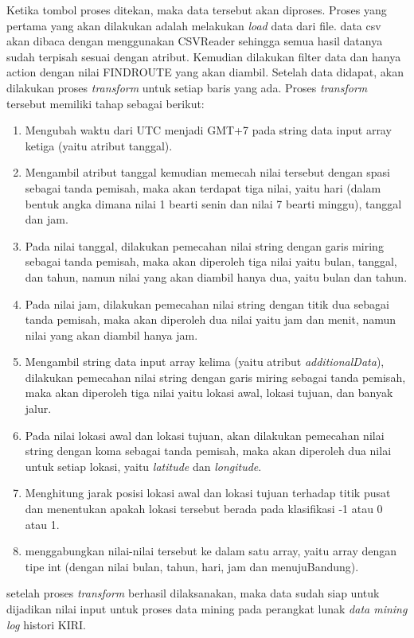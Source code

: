 Ketika tombol proses ditekan, maka data tersebut akan diproses. Proses yang pertama yang akan dilakukan adalah melakukan \textsl{load} data dari file. data csv akan dibaca dengan menggunakan CSVReader sehingga semua hasil datanya sudah terpisah sesuai dengan atribut. Kemudian dilakukan filter data dan hanya action dengan nilai FINDROUTE yang akan diambil. Setelah data didapat, akan dilakukan proses \textsl{transform} untuk setiap baris yang ada. Proses \textsl{transform} tersebut memiliki tahap sebagai berikut:
\begin{enumerate}
	\item Mengubah waktu dari UTC menjadi GMT+7 pada string data input array ketiga (yaitu atribut tanggal).
	\item Mengambil atribut tanggal kemudian memecah nilai tersebut dengan spasi sebagai tanda pemisah, maka akan terdapat tiga nilai, yaitu hari (dalam bentuk angka dimana nilai 1 bearti senin dan nilai 7 bearti minggu), tanggal dan jam.
	\item Pada nilai tanggal, dilakukan pemecahan nilai string dengan garis miring sebagai tanda pemisah, maka akan diperoleh tiga nilai yaitu bulan, tanggal, dan tahun, namun nilai yang akan diambil hanya dua, yaitu bulan dan tahun.
	\item Pada nilai jam, dilakukan pemecahan nilai string dengan titik dua sebagai tanda pemisah, maka akan diperoleh dua nilai yaitu jam dan menit, namun nilai yang akan diambil hanya jam.
	\item Mengambil string data input array kelima (yaitu atribut \textsl{additionalData}), dilakukan pemecahan nilai string dengan garis miring sebagai tanda pemisah, maka akan diperoleh tiga nilai yaitu lokasi awal, lokasi tujuan, dan banyak jalur.
	\item Pada nilai lokasi awal dan lokasi tujuan, akan dilakukan pemecahan nilai string dengan koma sebagai tanda pemisah, maka akan diperoleh dua nilai untuk setiap lokasi, yaitu \textsl{latitude} dan \textsl{longitude}.
	\item Menghitung jarak posisi lokasi awal dan lokasi tujuan terhadap titik pusat dan menentukan apakah lokasi tersebut berada pada klasifikasi -1 atau 0 atau 1.
	\item menggabungkan nilai-nilai tersebut ke dalam satu array, yaitu array dengan tipe int (dengan nilai bulan, tahun, hari, jam dan menujuBandung).
\end{enumerate}

setelah proses \textsl{transform} berhasil dilaksanakan, maka data sudah siap untuk dijadikan nilai input untuk proses data mining pada perangkat lunak \textsl{data mining log} histori KIRI.

